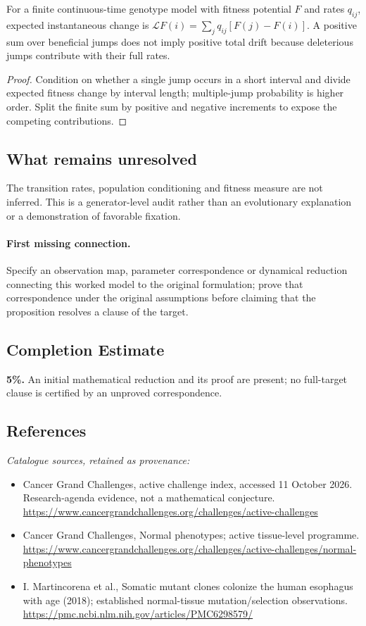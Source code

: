 \documentclass[11pt]{article}
\begin{document}
\begin{proposition}
For a finite continuous-time genotype model with fitness potential $F$ and rates $q_{ij}$, expected instantaneous change is $\mathcal LF(i)=\sum_jq_{ij}[F(j)-F(i)]$. A positive sum over beneficial jumps does not imply positive total drift because deleterious jumps contribute with their full rates.
\end{proposition}
\begin{proof}
Condition on whether a single jump occurs in a short interval and divide expected fitness change by interval length; multiple-jump probability is higher order. Split the finite sum by positive and negative increments to expose the competing contributions.
\end{proof}
\subsection{What remains unresolved}
The transition rates, population conditioning and fitness measure are not inferred. This is a generator-level audit rather than an evolutionary explanation or a demonstration of favorable fixation.
\paragraph{First missing connection.} Specify an observation map, parameter correspondence or dynamical reduction connecting this worked model to the original formulation; prove that correspondence under the original assumptions before claiming that the proposition resolves a clause of the target.
\subsection{Completion Estimate}
\textbf{5\%.} An initial mathematical reduction and its proof are present; no full-target clause is certified by an unproved correspondence.
\subsection{References}
\noindent\emph{Catalogue sources, retained as provenance:}
\begin{itemize}
\item Cancer Grand Challenges, active challenge index, accessed 11 October 2026. Research-agenda evidence, not a mathematical conjecture. \url{https://www.cancergrandchallenges.org/challenges/active-challenges}
\item Cancer Grand Challenges, Normal phenotypes; active tissue-level programme. \url{https://www.cancergrandchallenges.org/challenges/active-challenges/normal-phenotypes}
\item I. Martincorena et al., Somatic mutant clones colonize the human esophagus with age (2018); established normal-tissue mutation/selection observations. \url{https://pmc.ncbi.nlm.nih.gov/articles/PMC6298579/}
\end{itemize}
\end{document}
